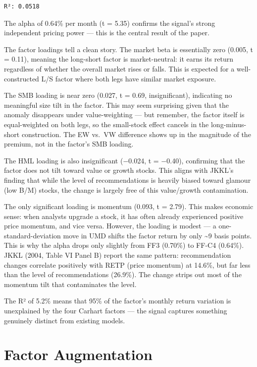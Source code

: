 \documentclass[
  letterpaper,
  DIV=11,
  numbers=noendperiod]{scrartcl}
\begin{document}
\begin{verbatim}
R²: 0.0518
\end{verbatim}

The alpha of 0.64\% per month (t = 5.35) confirms the signal's strong
independent pricing power --- this is the central result of the paper.

The factor loadings tell a clean story. The market beta is essentially
zero (0.005, t = 0.11), meaning the long-short factor is market-neutral:
it earns its return regardless of whether the overall market rises or
falls. This is expected for a well-constructed L/S factor where both
legs have similar market exposure.

The SMB loading is near zero (0.027, t = 0.69, insignificant),
indicating no meaningful size tilt in the factor. This may seem
surprising given that the anomaly disappears under value-weighting ---
but remember, the factor itself is equal-weighted on both legs, so the
small-stock effect cancels in the long-minus-short construction. The EW
vs.~VW difference shows up in the magnitude of the premium, not in the
factor's SMB loading.

The HML loading is also insignificant (−0.024, t = −0.40), confirming
that the factor does not tilt toward value or growth stocks. This aligns
with JKKL's finding that while the level of recommendations is heavily
biased toward glamour (low B/M) stocks, the change is largely free of
this value/growth contamination.

The only significant loading is momentum (0.093, t = 2.79). This makes
economic sense: when analysts upgrade a stock, it has often already
experienced positive price momentum, and vice versa. However, the
loading is modest --- a one-standard-deviation move in UMD shifts the
factor return by only \textasciitilde9 basis points. This is why the
alpha drops only slightly from FF3 (0.70\%) to FF-C4 (0.64\%). JKKL
(2004, Table VI Panel B) report the same pattern: recommendation changes
correlate positively with RETP (price momentum) at 14.6\%, but far less
than the level of recommendations (26.9\%). The change strips out most
of the momentum tilt that contaminates the level.

The R² of 5.2\% means that 95\% of the factor's monthly return variation
is unexplained by the four Carhart factors --- the signal captures
something genuinely distinct from existing models.

\section{Factor Augmentation}\label{factor-augmentation}
\end{document}
